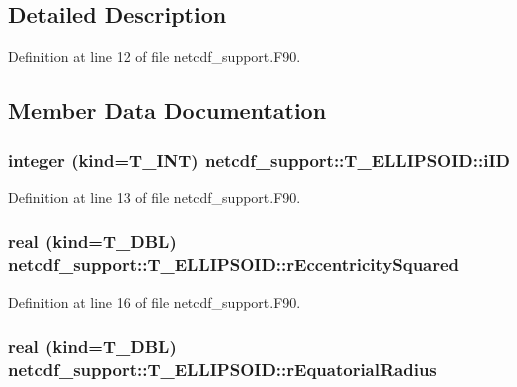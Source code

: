 \subsection{Detailed Description}


Definition at line 12 of file netcdf\_\-support.F90.



\subsection{Member Data Documentation}
\hypertarget{typenetcdf__support_1_1_t___e_l_l_i_p_s_o_i_d_a3433d789f59bd139a185ae29313ed2c8}{
\subsubsection[{iID}]{\setlength{\rightskip}{0pt plus 5cm}integer (kind=T\_\-INT) {\bf netcdf\_\-support::T\_\-ELLIPSOID::iID}}}
\label{typenetcdf__support_1_1_t___e_l_l_i_p_s_o_i_d_a3433d789f59bd139a185ae29313ed2c8}


Definition at line 13 of file netcdf\_\-support.F90.

\hypertarget{typenetcdf__support_1_1_t___e_l_l_i_p_s_o_i_d_a8d9f2954b922781f09393b869f7b80d3}{
\subsubsection[{rEccentricitySquared}]{\setlength{\rightskip}{0pt plus 5cm}real (kind=T\_\-DBL) {\bf netcdf\_\-support::T\_\-ELLIPSOID::rEccentricitySquared}}}
\label{typenetcdf__support_1_1_t___e_l_l_i_p_s_o_i_d_a8d9f2954b922781f09393b869f7b80d3}


Definition at line 16 of file netcdf\_\-support.F90.

\hypertarget{typenetcdf__support_1_1_t___e_l_l_i_p_s_o_i_d_a4e944cbfb135d13cdca903e043f25a80}{
\subsubsection[{rEquatorialRadius}]{\setlength{\rightskip}{0pt plus 5cm}real (kind=T\_\-DBL) {\bf netcdf\_\-support::T\_\-ELLIPSOID::rEquatorialRadius}}}
\label{typenetcdf__support_1_1_t___e_l_l_i_p_s_o_i_d_a4e944cbfb135d13cdca903e043f25a80}


